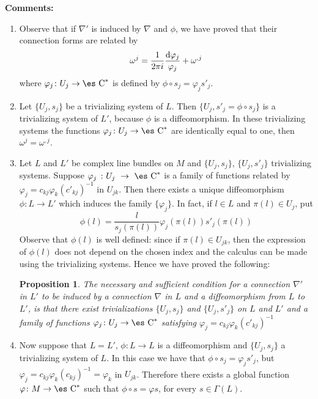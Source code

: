 \documentclass[12pt]{article}
\theoremstyle{plain}
\newtheorem{prop}{Proposition}
\def\beq{\begin{equation}}
\def\eeq{\end{equation}}
\def\d{{\rm d}}
\def\Complex{\mbox{\es C}}
\begin{document}
{\bf Comments:}
\begin{enumerate}
\item
Observe that if $\nabla '$ is induced by $\nabla$ and $\phi$,
we have proved that their connection forms are related by
\beq
\omega^j = \frac{1}{2\pi i}\frac{\d \varphi_j}{\varphi_j} + \omega^{,j}
\label{numerado}
\eeq
where $\varphi_j \colon U_j \to \Complex^*$ is defined by
$\phi \circ s_j = \varphi_j s'_j$.
\item
Let $\{ U_j,s_j \}$ be a trivializing system of $L$.
Then $\{ U_j,s'_j=\phi \circ s_j \}$ is a trivializing system of $L'$,
because $\phi$ is a diffeomorphism.
In these trivializing systems the functions
$\varphi_j \colon U_j \to \Complex^*$
are identically equal to one, then
$\omega^j = \omega^{,j}$.
\item
Let $L$ and $L'$ be complex line bundles on $M$
and $\{ U_j,s_j \}$, $\{ U_j,s'_j \}$
trivializing systems.
Suppose
$\varphi_j~\colon U_j~\to~\Complex^*$
is a family of functions related by
$\varphi_j = c_{kj} \varphi_k (c'_{kj})^{-1}$
in $U_{jk}$.
Then there exists a unique diffeomorphism
$\phi \colon L \to L'$
which induces the family $\{ \varphi_j \}$.
In fact, if $l \in L$ and $\pi (l) \in U_j$, put
$$
\phi (l) = \frac{l}{s_j (\pi (l))}\varphi_j (\pi (l))s'_j (\pi (l))
$$
Observe that $\phi (l)$ is well defined:
since if $\pi (l) \in U_{jk}$, then the expression of $\phi (l)$
does not depend on the chosen index and
the calculus can be made using the trivializing systems.
Hence we have proved the following:

\begin{prop}
The necessary and sufficient condition for
a connection $\nabla '$ in $L'$ to be induced by
a connection $\nabla$ in $L$ and a diffeomorphism
from $L$ to $L'$, is that there exist trivializations
$\{ U_j,s_j \}$ and $\{ U_j,s'_j \}$
on $L$ and $L'$ and a family of functions
$\varphi_j \colon U_j \to \Complex^*$
satisfying $\varphi_j = c_{kj} \varphi_k (c'_{kj})^{-1}$
\end{prop}

\item
Now suppose that $L = L'$,
$\phi \colon L \to L$ is a diffeomorphism and
$\{ U_j,s_j \}$ a trivializing system of $L$.
In this case we have that
$\phi \circ s_j = \varphi_j s'_j$,
but $\varphi_j = c_{kj}\varphi_k(c_{kj})^{-1}=\varphi_k$ in $U_{jk}$.
Therefore there exists a global function
$\varphi \colon M \to \Complex^*$
such that $\phi \circ s = \varphi s$, for every $s \in \Gamma (L)$.


\end{enumerate}
\end{document}
